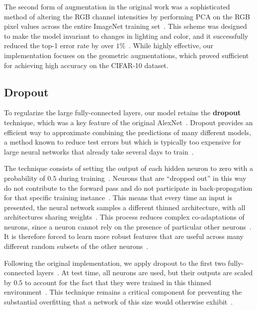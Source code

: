 \documentclass{article}
\begin{document}
The second form of augmentation in the original work was a sophisticated method of altering the RGB channel intensities by performing PCA on the RGB pixel values across the entire ImageNet training set~\cite{krizhevsky2012imagenet}. This scheme was designed to make the model invariant to changes in lighting and color, and it successfully reduced the top-1 error rate by over $1\%$~\cite{krizhevsky2012imagenet}. While highly effective, our implementation focuses on the geometric augmentations, which proved sufficient for achieving high accuracy on the CIFAR-10 dataset.

\subsection{Dropout}
\noindent
To regularize the large fully-connected layers, our model retains the \textbf{dropout} technique, which was a key feature of the original AlexNet~\cite{hinton2012improving}. Dropout provides an efficient way to approximate combining the predictions of many different models, a method known to reduce test errors but which is typically too expensive for large neural networks that already take several days to train~\cite{krizhevsky2012imagenet}.

The technique consists of setting the output of each hidden neuron to zero with a probability of $0.5$ during training~\cite{hinton2012improving}. Neurons that are ``dropped out'' in this way do not contribute to the forward pass and do not participate in back-propagation for that specific training instance~\cite{hinton2012improving}. This means that every time an input is presented, the neural network samples a different thinned architecture, with all architectures sharing weights~\cite{hinton2012improving}. This process reduces complex co-adaptations of neurons, since a neuron cannot rely on the presence of particular other neurons~\cite{hinton2012improving}. It is therefore forced to learn more robust features that are useful across many different random subsets of the other neurons~\cite{hinton2012improving}.

Following the original implementation, we apply dropout to the first two fully-connected layers~\cite{krizhevsky2012imagenet}. At test time, all neurons are used, but their outputs are scaled by $0.5$ to account for the fact that they were trained in this thinned environment~\cite{hinton2012improving}. This technique remains a critical component for preventing the substantial overfitting that a network of this size would otherwise exhibit~\cite{krizhevsky2012imagenet}.
\end{document}
